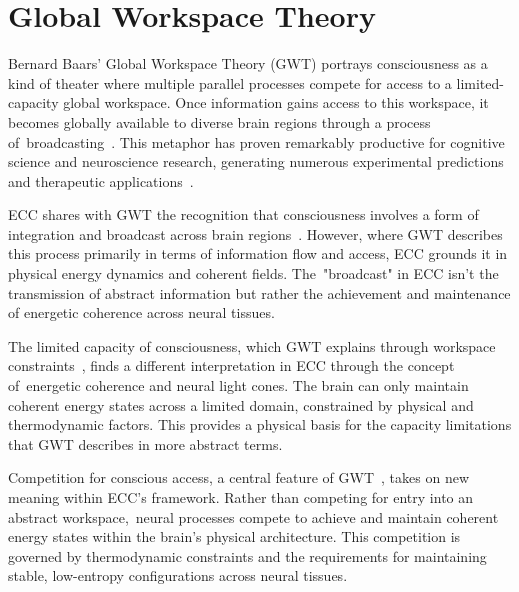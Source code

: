 \section{Global Workspace Theory}

Bernard Baars' Global Workspace Theory (GWT) portrays consciousness as a kind of theater where multiple parallel processes compete for access to a limited-capacity global workspace. Once information gains access to this workspace, it becomes globally available to diverse brain regions through a process of~broadcasting~\cite{Baars1988, Baars2002}. This metaphor has proven remarkably productive for cognitive science and neuroscience research, generating numerous experimental predictions and therapeutic applications~\cite{Dehaene2001, Dehaene2011}.

ECC shares with GWT the recognition that consciousness involves a form of integration and broadcast across brain regions~\cite{Baars2002, Baars2019}. However, where GWT describes this process primarily in terms of information flow and access, ECC grounds it in physical energy dynamics and coherent fields. The~"broadcast" in ECC isn't the transmission of abstract information but rather the achievement and maintenance of energetic coherence across neural tissues.

The limited capacity of consciousness, which GWT explains through workspace constraints~\cite{Dehaene2006, Dehaene2014}, finds a different interpretation in ECC through the concept of~energetic coherence and neural light cones. The brain can only maintain coherent energy states across a limited domain, constrained by physical and thermodynamic factors. This provides a physical basis for the capacity limitations that GWT describes in more abstract terms.

Competition for conscious access, a central feature of GWT~\cite{Dehaene2011, Mashour2020}, takes on new meaning within ECC's framework. Rather than competing for entry into an abstract workspace,~neural processes compete to achieve and maintain coherent energy states within the brain's physical architecture. This competition is governed by thermodynamic constraints and the requirements for maintaining stable, low-entropy configurations across neural tissues.

